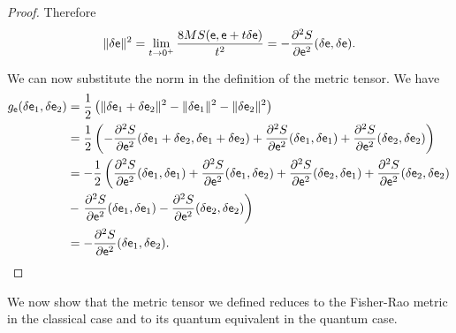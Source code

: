 \begin{mathSection}
\begin{proof}
	Therefore
	$$ \lVert \delta \mathsf{e} \rVert^2 = \lim_{t\to0^+}\frac{8MS(\mathsf{e},\mathsf{e}+t\delta\mathsf{e})}{t^2} = -  \frac{\partial^2 S}{\partial \mathsf{e}^2} (\delta \mathsf{e}, \delta \mathsf{e}).$$
	
	We can now substitute the norm in the definition of the metric tensor. We have
	\begin{equation}
		\begin{aligned}
			g_{\mathsf{e}}(\delta \mathsf{e}_1, \delta \mathsf{e}_2 ) &= \frac{1}{2} \left( \lVert \delta \mathsf{e}_1 + \delta \mathsf{e}_2 \rVert^2 - \lVert \delta \mathsf{e}_1 \rVert^2 - \lVert \delta \mathsf{e}_2 \rVert^2 \right) \\
			&= \frac{1}{2} \left( - \frac{\partial^2 S}{\partial \mathsf{e}^2} (\delta \mathsf{e}_1 + \delta \mathsf{e}_2, \delta \mathsf{e}_1 + \delta \mathsf{e}_2) + \frac{\partial^2 S}{\partial \mathsf{e}^2} (\delta \mathsf{e}_1, \delta \mathsf{e}_1) + \frac{\partial^2 S}{\partial \mathsf{e}^2} (\delta \mathsf{e}_2, \delta \mathsf{e}_2) \right) \\
			&= - \frac{1}{2} \left(  \frac{\partial^2 S}{\partial \mathsf{e}^2} (\delta \mathsf{e}_1, \delta \mathsf{e}_1) + \frac{\partial^2 S}{\partial \mathsf{e}^2} (\delta \mathsf{e}_1, \delta \mathsf{e}_2) + \frac{\partial^2 S}{\partial \mathsf{e}^2} (\delta \mathsf{e}_2, \delta \mathsf{e}_1) + \frac{\partial^2 S}{\partial \mathsf{e}^2} (\delta \mathsf{e}_2, \delta \mathsf{e}_2) \right. \\
			&-  \left. \frac{\partial^2 S}{\partial \mathsf{e}^2} (\delta \mathsf{e}_1, \delta \mathsf{e}_1) - \frac{\partial^2 S}{\partial \mathsf{e}^2} (\delta \mathsf{e}_2, \delta \mathsf{e}_2) \right) \\
			&= - \frac{\partial^2 S}{\partial \mathsf{e}^2} (\delta \mathsf{e}_1, \delta \mathsf{e}_2). \\
		\end{aligned}
	\end{equation}
\end{proof}
\end{mathSection}

We now show that the metric tensor we defined reduces to the Fisher-Rao metric in the classical case and to its quantum equivalent in the quantum case.

